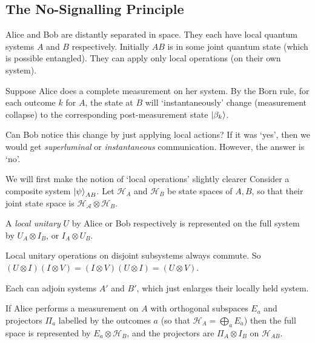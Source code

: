 \documentclass[a4paper]{article}
\begin{document}
\subsection{The No-Signalling Principle}

Alice and Bob are distantly separated in space. They each have local quantum systems $A$ and $B$ respectively. Initially $AB$ is in some joint quantum state (which is possible entangled). They can apply only local operations (on their own system).

Suppose Alice does a complete measurement on her system. 
By the Born rule, for each outcome $k$ for $A$, the state at $B$ will `instantaneously' change (measurement collapse) to the corresponding post-measurement state $\ket{\beta_k}$.

Can Bob notice this change by just applying local actions?
If it was `yes', then we would get \emph{superluminal} or \emph{instantaneous} communication.
However, the answer is `no'.

We will first make the notion of `local operations' slightly clearer Consider a composite system $\ket{\psi}_{AB}$. Let $\mathcal{H}_A$ and $\mathcal{H}_B$ be state spaces of $A, B$, so that their joint state space is $\mathcal{H_A} \otimes \mathcal{H}_B$.

\begin{definition}
	A \emph{local unitary} $U$ by Alice or Bob respectively is represented on the full system by $U_A \otimes I_B$, or $I_A \otimes U_B$.
\end{definition}

\begin{remark}
	Local unitary operations on disjoint subsystems always commute.
	So $(U \otimes I)(I \otimes V) = (I \otimes V)(U \otimes I) = (U \otimes V)$.
\end{remark}

\begin{definition}
	Each can adjoin  systems $A'$ and $B'$, which just enlarges their locally held system.
\end{definition}

\begin{definition}
	If Alice performs a measurement on $A$ with orthogonal subspaces 
	$E_a$ and projectors $\Pi_a$ labelled by the outcomes $a$ (so that $\mathcal{H}_A = \bigoplus_{a} E_a$) then the full space is represented by $E_a \otimes \mathcal{H}_B$, and the projectors are $\Pi_A \otimes I_B$ on $\mathcal{H}_{AB}$.
\end{definition}
\end{document}
